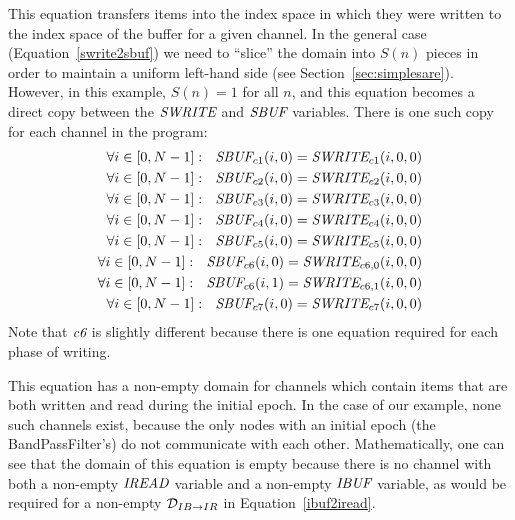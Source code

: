 This equation transfers items into the index space in which they were
written to the index space of the buffer for a given channel.  In the
general case (Equation~\ref{swrite2sbuf}) we need to ``slice'' the
domain into $S(n)$ pieces in order to maintain a uniform left-hand
side (see Section~\ref{sec:simplesare}).  However, in this example,
$S(n) = 1$ for all $n$, and this equation becomes a direct copy
between the $\mbox{\it SWRITE}$ and $\mbox{\it SBUF}$ variables.  There is one
such copy for each channel in the program:
\begin{align*}
\forall i \in [0, N-1]:~~\mbox{\it SBUF}_{c1}(i, 0) = \mbox{\it SWRITE}_{c1}(i, 0, 0) \\
\forall i \in [0, N-1]:~~\mbox{\it SBUF}_{c2}(i, 0) = \mbox{\it SWRITE}_{c2}(i, 0, 0) \\
\forall i \in [0, N-1]:~~\mbox{\it SBUF}_{c3}(i, 0) = \mbox{\it SWRITE}_{c3}(i, 0, 0) \\
\forall i \in [0, N-1]:~~\mbox{\it SBUF}_{c4}(i, 0) = \mbox{\it SWRITE}_{c4}(i, 0, 0) \\
\forall i \in [0, N-1]:~~\mbox{\it SBUF}_{c5}(i, 0) = \mbox{\it SWRITE}_{c5}(i, 0, 0) \\
\forall i \in [0, N-1]:~~\mbox{\it SBUF}_{c6}(i, 0) = \mbox{\it SWRITE}_{{c6}, 0}(i, 0, 0) \\
\forall i \in [0, N-1]:~~\mbox{\it SBUF}_{c6}(i, 1) = \mbox{\it SWRITE}_{{c6}, 1}(i, 0, 0) \\
\forall i \in [0, N-1]:~~\mbox{\it SBUF}_{c7}(i, 0) = \mbox{\it SWRITE}_{c7}(i, 0, 0)
\end{align*}
Note that $\mbox{\it c6}$ is slightly different because there is one
equation required for each phase of writing.


This equation has a non-empty domain for channels which contain items
that are both written and read during the initial epoch.  In the case
of our example, none such channels exist, because the only nodes with
an initial epoch (the BandPassFilter's) do not communicate with each
other.  Mathematically, one can see that the domain of this equation
is empty because there is no channel with both a non-empty
$\mbox{\it IREAD}$ variable and a non-empty $\mbox{\it IBUF}$ variable, as would
be required for a non-empty ${\cal D}_{IB \rightarrow IR}$ in
Equation~\ref{ibuf2iread}.


